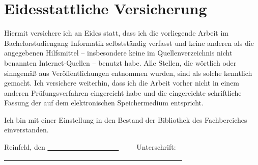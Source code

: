 \chapter*{Eidesstattliche Versicherung}
\thispagestyle{empty}

Hiermit versichere ich an Eides statt, dass ich die vorliegende Arbeit im
Bachelorstudiengang Informatik selbstständig verfasst und keine anderen als die
angegebenen Hilfsmittel -- insbesondere keine im Quellenverzeichnis nicht
benannten Internet-Quellen -- benutzt habe. Alle Stellen, die wörtlich oder
sinngemäß aus Veröffentlichungen entnommen wurden, sind als solche kenntlich
gemacht.
Ich versichere weiterhin, dass ich die Arbeit vorher nicht in einem anderen Prüfungsverfahren eingereicht habe und die eingereichte schriftliche Fassung der auf dem elektronischen Speichermedium entspricht.

\noindent Ich bin mit einer Einstellung in den Bestand der Bibliothek des Fachbereiches einverstanden.

\vspace{2cm} 

\noindent Reinfeld, den \uline{~~~~~~~~~~~~~~~~~~~~}~~~~~Unterschrift: \uline{~~~~~~~~~~~~~~~~~~~~~~~~~~~~~~~~~~~~~~~~~~~~~~~~~~} 
